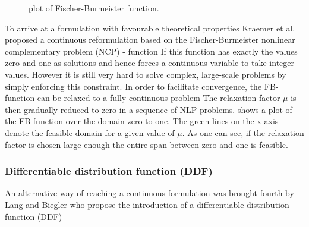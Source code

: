         \begin{figure}
            \scriptsize
            \center
            
            \caption{plot of Fischer-Burmeister function.}
            \label{fig:FB_plot}
        \end{figure}
    
        To arrive at a formulation with favourable theoretical properties Kraemer et al. \cite{Kraemer.2009} proposed
        a continuous reformulation based on the Fischer-Burmeister nonlinear complementary problem (NCP) - function
        If this function has exactly the values zero and one as solutions and hence forces a continuous variable to
        take integer values. However it is still very hard to solve complex, large-scale problems by simply enforcing this
        constraint. In order to facilitate convergence, the FB-function can be relaxed to a fully continuous problem
        The relaxation factor $\mu$ is then gradually reduced to zero in a sequence of NLP problems. 
        shows a plot of the FB-function over the domain zero to one. The green lines on the x-axis denote the feasible domain
        for a given value of $\mu$. As one can see, if the relaxation factor is chosen large enough the entire span
        between zero and one is feasible.
    
        \subsubsection{Differentiable distribution function (DDF)}
        An alternative way of reaching a continuous formulation was brought fourth by Lang and Biegler \cite{Lang.2002}
        who propose the introduction of a differentiable distribution function (DDF)
        